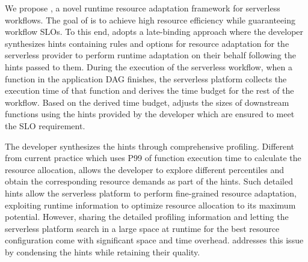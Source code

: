 We propose \namex, a novel runtime resource adaptation framework for serverless workflows. The goal of \namex is to achieve high resource efficiency while guaranteeing workflow SLOs. To this end, \namex adopts a late-binding approach where the developer synthesizes hints containing rules and options for resource adaptation for the serverless provider to perform runtime adaptation on their behalf following the hints passed to them. During the execution of the serverless workflow, when a function in the application DAG finishes, the serverless platform collects the execution time of that function and derives the time budget for the rest of the workflow. Based on the derived time budget, \namex adjusts the sizes of downstream functions using the hints provided by the developer which are ensured to meet the SLO requirement. 

The developer synthesizes the hints through comprehensive profiling. Different from current practice which uses P99 of function execution time to calculate the resource allocation, \namex allows the developer to explore different percentiles and obtain the corresponding resource demands as part of the hints. Such detailed hints allow the serverless platform to perform fine-grained resource adaptation, exploiting runtime information to optimize resource allocation to its maximum potential. However, sharing the detailed profiling information and letting the serverless platform search in a large space at runtime for the best resource configuration come with significant space and time overhead. \namex addresses this issue by condensing the hints while retaining their quality. 


